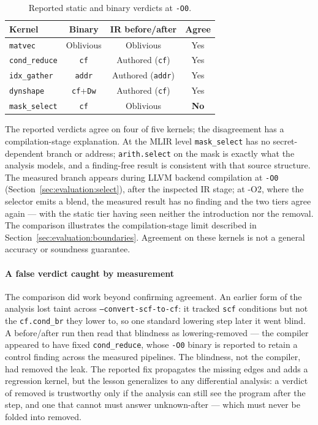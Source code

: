\begin{table}[t]
\caption{Reported static and binary verdicts at \texttt{-O0}.}
\label{tab:static-analysis-results}
\centering
\footnotesize
\setlength{\tabcolsep}{3pt}
\begin{tabular}{@{}lccc@{}}
\hline
Kernel & Binary & IR before/after & Agree \\
\hline
\texttt{matvec} & Oblivious & Oblivious & Yes \\
\texttt{cond\_reduce} & \texttt{cf} & Authored (\texttt{cf}) & Yes \\
\texttt{idx\_gather} & \texttt{addr} & Authored (\texttt{addr}) & Yes \\
\texttt{dynshape} & \texttt{cf}+\texttt{Dw} & Authored (\texttt{cf}) & Yes \\
\texttt{mask\_select} & \texttt{cf} & Oblivious & \textbf{No} \\
\hline
\end{tabular}
\end{table}

The reported verdicts agree on four of five kernels; the disagreement has a compilation-stage explanation.
At the MLIR level \texttt{mask\_select} has no secret-dependent branch or address; \texttt{arith.select} on the mask is exactly what the analysis models, and a finding-free result is consistent with that source structure.
The measured branch appears during LLVM backend compilation at \texttt{-O0} (Section~\ref{sec:evaluation:select}), after the inspected IR stage; at -O2, where the selector emits a blend, the measured result has no finding and the two tiers agree again --- with the static tier having seen neither the introduction nor the removal.
The comparison illustrates the compilation-stage limit described in Section~\ref{sec:evaluation:boundaries}.
Agreement on these kernels is not a general accuracy or soundness guarantee.

\paragraph{A false verdict caught by measurement} The comparison did work beyond confirming agreement.
An earlier form of the analysis lost taint across \texttt{--convert-scf-to-cf}: it tracked \texttt{scf} conditions but not the \texttt{cf.cond\_br} they lower to, so one standard lowering step later it went blind.
A before/after run then read that blindness as lowering-removed --- the compiler appeared to have fixed \texttt{cond\_reduce}, whose \texttt{-O0} binary is reported to retain a control finding across the measured pipelines.
The blindness, not the compiler, had removed the leak.
The reported fix propagates the missing edges and adds a regression kernel, but the lesson generalizes to any differential analysis: a verdict of removed is trustworthy only if the analysis can still see the program after the step, and one that cannot must answer unknown-after --- which must never be folded into removed.

